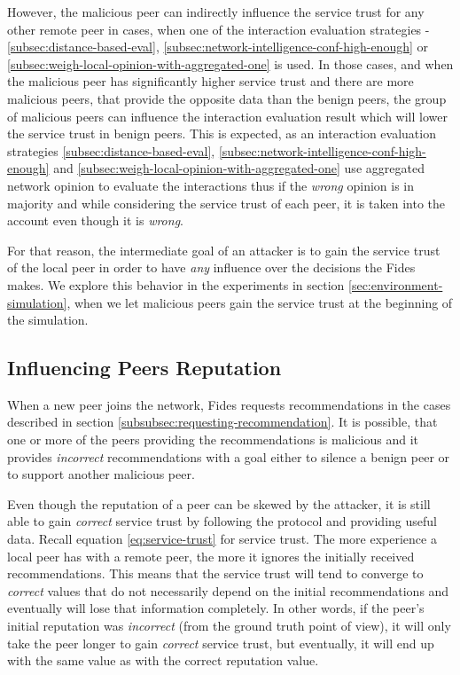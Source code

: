 However, the malicious peer can indirectly influence the service trust for any other remote peer in cases, when one of the interaction evaluation strategies - \ref{subsec:distance-based-eval}, \ref{subsec:network-intelligence-conf-high-enough} or \ref{subsec:weigh-local-opinion-with-aggregated-one} is used.
In those cases, and when the malicious peer has significantly higher service trust and there are more malicious peers, that provide the opposite data than the benign peers, the group of malicious peers can influence the interaction evaluation result which will lower the service trust in benign peers.
This is expected, as an interaction evaluation strategies \ref{subsec:distance-based-eval}, \ref{subsec:network-intelligence-conf-high-enough} and \ref{subsec:weigh-local-opinion-with-aggregated-one} use aggregated network opinion to evaluate the interactions thus if the \textit{wrong} opinion is in majority and while considering the service trust of each peer, it is taken into the account even though it is \textit{wrong}.

For that reason, the intermediate goal of an attacker is to gain the service trust of the local peer in order to have \textit{any} influence over the decisions the Fides makes.
We explore this behavior in the experiments in section \ref{sec:environment-simulation}, when we let malicious peers gain the service trust at the beginning of the simulation.

\subsection{Influencing Peers Reputation}
\label{subsec:influencing-peers-reputation}
When a new peer joins the network, Fides requests recommendations in the cases described in section \ref{subsubsec:requesting-recommendation}.
It is possible, that one or more of the peers providing the recommendations is malicious and it provides \textit{incorrect} recommendations with a goal either to silence a benign peer or to support another malicious peer.

Even though the reputation of a peer can be skewed by the attacker, it is still able to gain \textit{correct} service trust by following the protocol and providing useful data.
Recall equation \ref{eq:service-trust} for service trust. The more experience a local peer has with a remote peer, the more it ignores the initially received recommendations.
This means that the service trust will tend to converge to \textit{correct} values that do not necessarily depend on the initial recommendations and eventually will lose that information completely.
In other words, if the peer's initial reputation was \textit{incorrect} (from the ground truth point of view), it will only take the peer longer to gain \textit{correct} service trust, but eventually, it will end up with the same value as with the correct reputation value.

